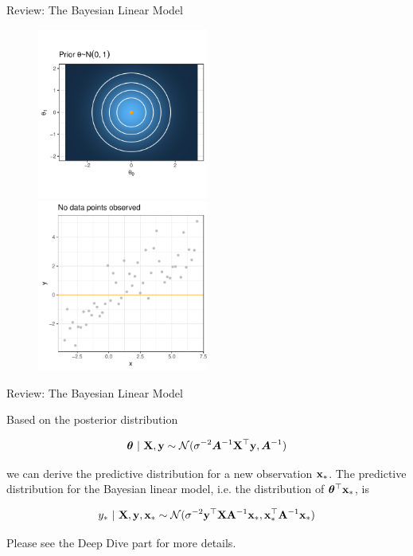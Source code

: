 \documentclass[11pt,compress,t,notes=noshow, xcolor=table]{beamer}
\begin{document}
\begin{vbframe}{Review: The Bayesian Linear Model}
    \begin{figure}
      \includegraphics[width=0.5\textwidth]{figure/bayes_lm/prior_1.pdf}~\includegraphics[width=0.5\textwidth]{figure/bayes_lm/prior_2.pdf}
    \end{figure}

\end{vbframe}
    
    
\begin{vbframe}{Review: The Bayesian Linear Model} 
    
    Based on the posterior distribution 
    
    $$
    \bm{\theta} ~|~ \mathbf{X}, \mathbf{y} \sim \mathcal{N}(\sigma^{-2}\bm{A}^{-1}\mathbf{X}^\top\mathbf{y}, \bm{A}^{-1})
    $$
    
    we can derive the predictive distribution for a new observation $\mathbf{x}_*$. The predictive distribution for the Bayesian linear model, i.e. the distribution of $\bm{\theta}^\top \mathbf{x}_*$, is 
    
    $$
    y_* ~|~ \mathbf{X}, \mathbf{y}, \mathbf{x}_* \sim \mathcal{N}(\sigma^{-2}\mathbf{y}^\top \mathbf{X} \mathbf{A}^{-1}\mathbf{x}_*, \mathbf{x}_*^\top\mathbf{A}^{-1}\mathbf{x}_*)
    $$ 

    Please see the Deep Dive part for more details.
    
\end{vbframe}
\end{document}
